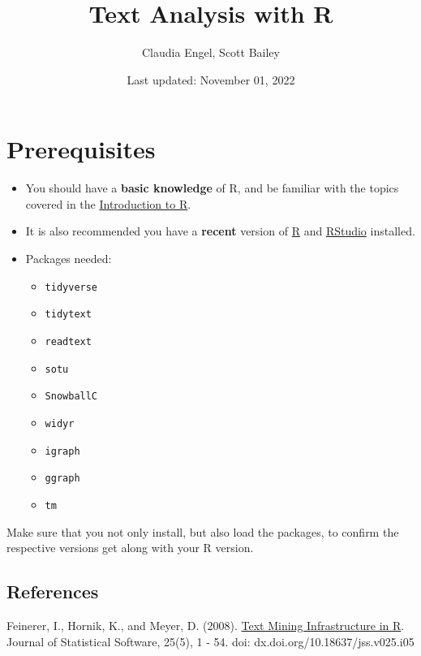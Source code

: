 \documentclass[
]{book}
\title{Text Analysis with R}
\author{Claudia Engel, Scott Bailey}
\date{Last updated: November 01, 2022}
\providecommand{\tightlist}{%
  \setlength{\itemsep}{0pt}\setlength{\parskip}{0pt}}
\begin{document}
\maketitle

{
\setcounter{tocdepth}{1}
\tableofcontents
}
\hypertarget{prerequisites}{%
\chapter*{Prerequisites}\label{prerequisites}}

\begin{itemize}
\item
  You should have a \textbf{basic knowledge} of R, and be familiar with the topics covered in the \href{https://cengel.github.io/R-intro/}{Introduction to R}.
\item
  It is also recommended you have a \textbf{recent} version of \href{https://cran.r-project.org/}{R} and \href{https://www.rstudio.com/}{RStudio} installed.
\item
  Packages needed:

  \begin{itemize}
  \tightlist
  \item
    \texttt{tidyverse}
  \item
    \texttt{tidytext}
  \item
    \texttt{readtext}
  \item
    \texttt{sotu}
  \item
    \texttt{SnowballC}
  \item
    \texttt{widyr}
  \item
    \texttt{igraph}
  \item
    \texttt{ggraph}
  \item
    \texttt{tm}
  \end{itemize}
\end{itemize}

Make sure that you not only install, but also load the packages, to confirm the respective versions get along with your R version.

\hypertarget{references}{%
\section*{References}\label{references}}

Feinerer, I., Hornik, K., and Meyer, D. (2008). \href{http://dx.doi.org/10.18637/jss.v025.i05}{Text Mining Infrastructure in R}. Journal of Statistical Software, 25(5), 1 - 54. doi: dx.doi.org/10.18637/jss.v025.i05
\end{document}
